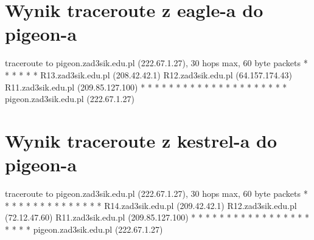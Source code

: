 \documentclass{article}
\begin{document}
\section*{Wynik traceroute z eagle-a do pigeon-a}
traceroute to pigeon.zad3sik.edu.pl (222.67.1.27), 30 hops max, 60 byte packets  * * *  * * *  R13.zad3sik.edu.pl (208.42.42.1)  R12.zad3sik.edu.pl (64.157.174.43)  R11.zad3sik.edu.pl (209.85.127.100)  * * *  * * *  * * *  * * *  * * *  * * *  * * *  pigeon.zad3sik.edu.pl (222.67.1.27) \newline

\section*{Wynik traceroute z kestrel-a do pigeon-a}
traceroute to pigeon.zad3sik.edu.pl (222.67.1.27), 30 hops max, 60 byte packets  * * *  * * *  * * *  * * *  * * *  R14.zad3sik.edu.pl (209.42.42.1)  R12.zad3sik.edu.pl (72.12.47.60)  R11.zad3sik.edu.pl (209.85.127.100)  * * *  * * *  * * *  * * *  * * *  * * *  * * *  pigeon.zad3sik.edu.pl (222.67.1.27) \newline
\end{document}
